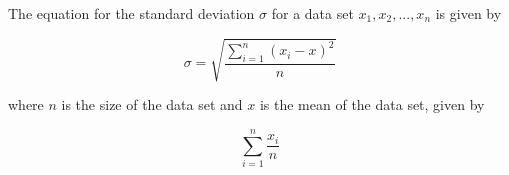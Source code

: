 The equation for the standard deviation $\sigma$ for a data set  ${x_1, x_2, ..., x_n}$ is given by
 
\[ \sigma = \sqrt{\frac{\sum_{i=1}^{n}{(x_i - x)^2}}{n}} \]

where $n$ is the size of the data set and $x$ is the mean of the data set, given by

\[ \sum_{i= 1}^{n}\frac{x_i}{n} \]